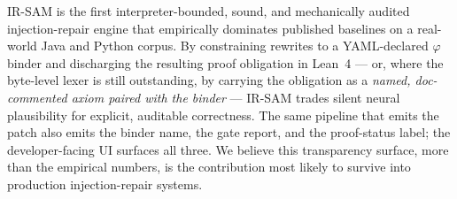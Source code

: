 \documentclass[conference]{IEEEtran}
\newcommand{\IRSAM}{\textsc{IR-SAM}}
\newcommand{\phisig}{\ensuremath{\varphi}}
\begin{document}
\IRSAM{} is the first interpreter-bounded, sound, and mechanically
audited injection-repair engine that empirically dominates
published baselines on a real-world Java and Python corpus.  By
constraining rewrites to a YAML-declared $\phisig$ binder and
discharging the resulting proof obligation in Lean~4 --- or,
where the byte-level lexer is still outstanding, by carrying the
obligation as a \emph{named, doc-commented axiom paired with the
binder} --- \IRSAM{} trades silent neural plausibility for
explicit, auditable correctness. The same pipeline that emits the
patch also emits the binder name, the gate report, and the
proof-status label; the developer-facing UI surfaces all three. We
believe this transparency surface, more than the empirical
numbers, is the contribution most likely to survive into
production injection-repair systems.

\balance


\end{document}
